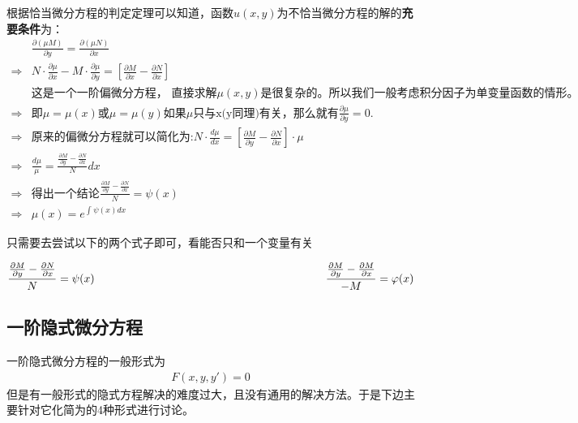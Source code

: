 \documentclass[fontset=windows]{article}
\begin{document}
    根据恰当微分方程的判定定理可以知道，函数$u(x, y)$为不恰当微分方程的解的\textbf{充要条件}为：
    \begin{align}
        &\frac{\partial (\mu M)}{\partial y}=\frac{\partial (\mu N)}{\partial x}\nonumber\\
        \Longrightarrow& N  \cdot \frac{\partial \mu}{\partial x}-M\cdot \frac{\partial \mu}{\partial y} = [\frac{\partial M}{\partial x} - \frac{\partial N}{\partial x}]\nonumber\\
        &\text{这是一个一阶偏微分方程， 直接求解$\mu(x, y)$是很复杂的。所以我们一般考虑积分因子为单变量函数的情形。}\nonumber\\
        \Longrightarrow& \text{即}\mu= \mu(x)\text{或}\mu = \mu(y)\text{如果$\mu$只与x(y同理)有关，那么就有} \frac{\partial \mu}{\partial y}=0.\nonumber\\
        \Longrightarrow& \text{原来的偏微分方程就可以简化为:}N\cdot \frac{d\mu}{d x} = [\frac{\partial M}{\partial y}-\frac{\partial N}{\partial x}]\cdot\mu\nonumber\\
        \Longrightarrow&\frac{d\mu}{\mu} = \frac{\frac{\partial M}{\partial y}-\frac{\partial N}{\partial x}}{N}
        dx\nonumber\\
        \Longrightarrow& \text{得出一个结论}\frac{\frac{\partial M}{\partial y}-\frac{\partial N}{\partial x}}{N}=\psi(x)\nonumber\\
        \Longrightarrow& \mu (x) = e^{\int_{}^{}{\psi (x) dx}}\nonumber
    \end{align}

    \begin{tcolorbox}[colback=blue!5!white,colframe=blue!75!black,title=积分因子的寻找方法] 
    只需要去尝试以下的两个式子即可，看能否只和一个变量有关

    \vspace{3pt}

    $
    \begin{aligned}
        \frac{\frac{\partial M}{\partial y}-\frac{\partial N}{\partial x}}{N}=\psi(x) \hspace*{0.6\linewidth} \frac{\frac{\partial M}{\partial y}-\frac{\partial M}{\partial x}}{-M}=\varphi(x)\nonumber
     \end{aligned} 
    $

     \end{tcolorbox}

     \subsection{一阶隐式微分方程}
     一阶隐式微分方程的一般形式为
     \begin{align}
         F(x, y, y') = 0\nonumber
     \end{align}
     但是有一般形式的隐式方程解决的难度过大，且没有通用的解决方法。于是下边主要针对它化简为的4种形式进行讨论。
     
\end{document}
